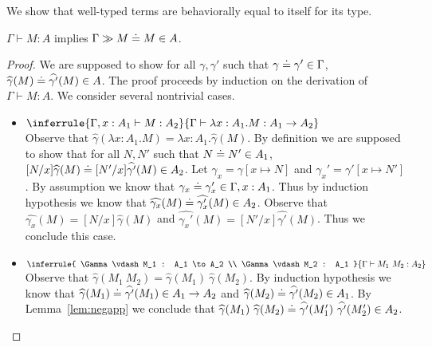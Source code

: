 \documentclass{article}
\newcommand{\G}{\Gamma}
\newcommand{\entails}{\vdash}
\newcommand{\eapp}[2]{#1~#2}
\newcommand{\eabs}[3]{\lambda #1:#2.#3}
\begin{document}
We show that well-typed terms are behaviorally equal to itself for its type.

\begin{lemma} \label{lem:typingrefl}
$\G \entails M : A$ implies $\G \gg M \eeq M \in A$.
\end{lemma}
\begin{proof}
We are supposed to show for all $\gamma,\gamma'$ such that $\gamma \eeq \gamma' \in \G$, $\widehat{\gamma}(M) \doteq \widehat{\gamma'}(M) \in A$.
The proof proceeds by induction on the derivation of $\G \entails M : A$.
We consider several nontrivial cases.
\begin{itemize}
    \item $\inferrule{ \G, x : A_1 \entails M : A_2 }{ \G \entails \eabs{x}{A_1}{M} : A_1 \to A_2 }$\\
    Observe that $\widehat{\gamma}(\eabs{x}{A_1}{M}) = \eabs{x}{A_1}{\widehat{\gamma}(M)}$.
    By definition we are supposed to show that for all $N,N'$ such that $N \doteq N' \in A_1$, $[N/x] \widehat{\gamma}(M) \doteq [N'/x] \widehat{\gamma'}(M) \in A_2$.
    Let $\gamma_x = \gamma[x \mapsto N]$ and $\gamma_x' = \gamma'[x \mapsto N']$.
    By assumption we know that $\gamma_x \eeq \gamma_x' \in \G,x:A_1$.
    Thus by induction hypothesis we know that $\widehat{\gamma_x}(M) \doteq \widehat{\gamma_x'}(M) \in A_2$.
    Observe that $\widehat{\gamma_x}(M) = [N/x]\widehat{\gamma}(M)$ and $\widehat{\gamma_x'}(M) = [N'/x]\widehat{\gamma'}(M)$.
    Thus we conclude this case.
    
    \item $\inferrule{ \G \entails M_1 : A_1 \to A_2 \\ \G \entails M_2 : A_1 }{ \G \entails \eapp{M_1}{M_2} : A_2 }$\\
    Observe that $\widehat{\gamma}(\eapp{M_1}{M_2}) = \eapp{\widehat{\gamma}(M_1)}{\widehat{\gamma}(M_2)}$.
    By induction hypothesis we know that $\widehat{\gamma}(M_1) \doteq \widehat{\gamma'}(M_1) \in A_1 \to A_2$ and $\widehat{\gamma}(M_2) \doteq \widehat{\gamma'}(M_2) \in A_1$.
    By Lemma~\ref{lem:negapp} we conclude that $\eapp{\widehat{\gamma}(M_1)}{\widehat{\gamma}(M_2)} \eeq \eapp{\widehat{\gamma'}(M_1')}{\widehat{\gamma'}(M_2')} \in A_2$.
    

\end{itemize}
\end{proof}
\end{document}
